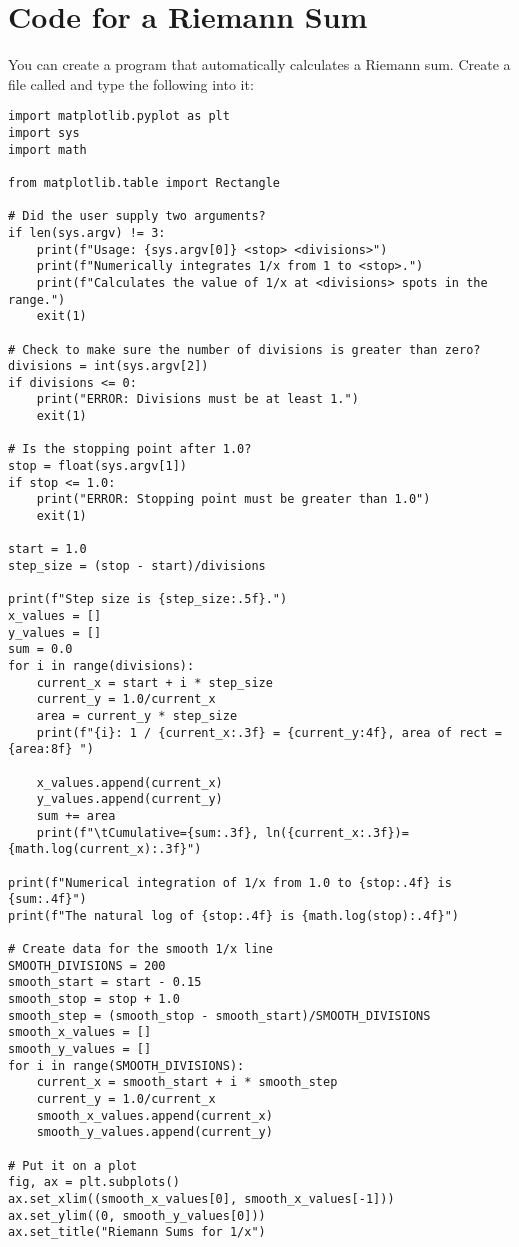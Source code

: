 \section{Code for a Riemann Sum}
You can create a program that automatically calculates a Riemann sum. Create a file called  and type the following into it:

\begin{Verbatim}
import matplotlib.pyplot as plt
import sys
import math

from matplotlib.table import Rectangle

# Did the user supply two arguments?
if len(sys.argv) != 3:
    print(f"Usage: {sys.argv[0]} <stop> <divisions>")
    print(f"Numerically integrates 1/x from 1 to <stop>.")
    print(f"Calculates the value of 1/x at <divisions> spots in the range.")
    exit(1)

# Check to make sure the number of divisions is greater than zero?
divisions = int(sys.argv[2])
if divisions <= 0:
    print("ERROR: Divisions must be at least 1.")
    exit(1)

# Is the stopping point after 1.0?
stop = float(sys.argv[1])
if stop <= 1.0:
    print("ERROR: Stopping point must be greater than 1.0")
    exit(1)

start = 1.0
step_size = (stop - start)/divisions

print(f"Step size is {step_size:.5f}.")
x_values = []
y_values = []
sum = 0.0
for i in range(divisions):
    current_x = start + i * step_size
    current_y = 1.0/current_x
    area = current_y * step_size
    print(f"{i}: 1 / {current_x:.3f} = {current_y:4f}, area of rect = {area:8f} ")

    x_values.append(current_x)
    y_values.append(current_y)
    sum += area
    print(f"\tCumulative={sum:.3f}, ln({current_x:.3f})={math.log(current_x):.3f}")

print(f"Numerical integration of 1/x from 1.0 to {stop:.4f} is {sum:.4f}")
print(f"The natural log of {stop:.4f} is {math.log(stop):.4f}")

# Create data for the smooth 1/x line
SMOOTH_DIVISIONS = 200
smooth_start = start - 0.15
smooth_stop = stop + 1.0
smooth_step = (smooth_stop - smooth_start)/SMOOTH_DIVISIONS
smooth_x_values = []
smooth_y_values = []
for i in range(SMOOTH_DIVISIONS):
    current_x = smooth_start + i * smooth_step
    current_y = 1.0/current_x
    smooth_x_values.append(current_x)
    smooth_y_values.append(current_y)

# Put it on a plot
fig, ax = plt.subplots()
ax.set_xlim((smooth_x_values[0], smooth_x_values[-1]))
ax.set_ylim((0, smooth_y_values[0]))
ax.set_title("Riemann Sums for 1/x")


\end{Verbatim}

